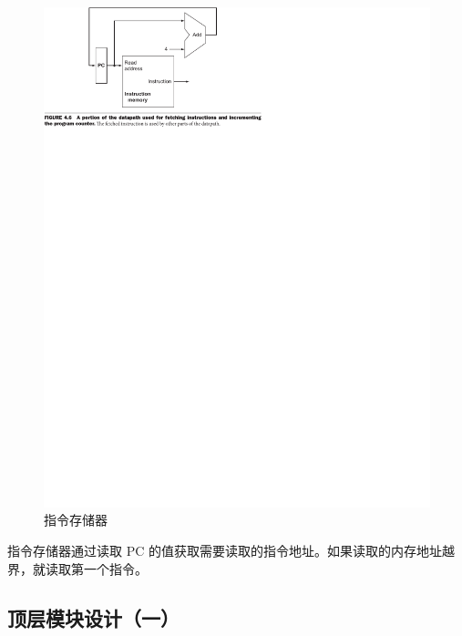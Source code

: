 \documentclass[a4paper,UTF8]{ctexart}
\begin{document}
\begin{figure}[h]
    \centering
    \includegraphics[width=\textwidth]{instruction.pdf}
    \caption{指令存储器}
    \label{fig:instr}
\end{figure}

指令存储器通过读取 PC 的值获取需要读取的指令地址。如果读取的内存地址越界，就读取第一个指令。

\subsection{顶层模块设计（一）}
\end{document}
